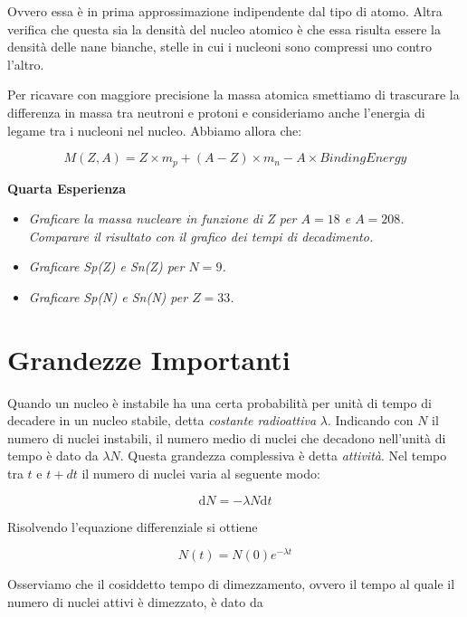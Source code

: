 Ovvero essa è in prima approssimazione indipendente dal tipo di atomo. 
Altra verifica che questa sia la densità del nucleo atomico è che essa risulta essere la densità delle nane bianche, stelle in cui i nucleoni sono compressi uno contro l'altro.
                                                                                                                    
Per ricavare con maggiore precisione la massa atomica smettiamo di trascurare la differenza in massa tra neutroni e protoni e consideriamo anche l'energia di legame tra i nucleoni nel nucleo. Abbiamo allora che:

\begin{equation}
M(Z,A)=Z\times m_p+(A-Z)\times m_n-A\times BindingEnergy
\end{equation}

\textbf{Quarta Esperienza}

\begin{itemize}
\item \emph{Graficare la massa nucleare in funzione di Z per $A=18$ e $A=208$. Comparare il risultato con il grafico dei tempi di decadimento.}
\item \emph{Graficare Sp(Z) e Sn(Z) per $N=9$.}
\item \emph{Graficare Sp(N) e Sn(N) per $Z=33$.}
\end{itemize}


\section{Grandezze Importanti}

Quando un nucleo è instabile ha una certa probabilità per unità di tempo di decadere in un nucleo stabile, detta \emph{costante radioattiva} $\lambda$. 
Indicando con $N$ il numero di nuclei instabili, il numero medio di nuclei che decadono nell'unità di tempo è dato da $\lambda N$. Questa grandezza complessiva è detta \emph{attività}. Nel tempo tra $t$ e $t+dt$ il numero di nuclei varia al seguente modo:

\begin{equation}
\mathrm{d}N=-\lambda N \mathrm{d}t
\end{equation}

Risolvendo l'equazione differenziale si ottiene

\begin{equation}
N(t)=N(0)e^{-\lambda t}
\end{equation}

Osserviamo che il cosiddetto tempo di dimezzamento, ovvero il tempo al quale il numero di nuclei attivi è dimezzato, è dato da


